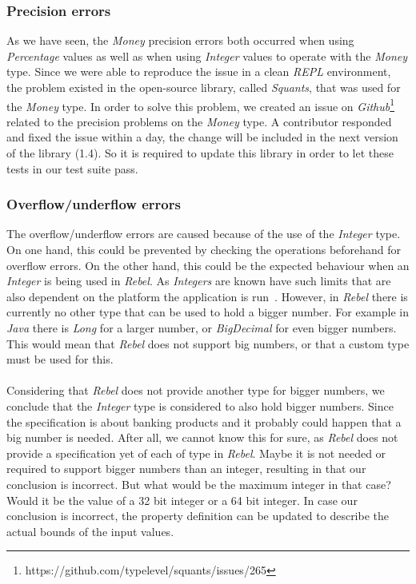 \subsubsection{Precision errors}
As we have seen, the \textit{Money} precision errors both occurred when using
\textit{Percentage} values as well as when using \textit{Integer} values to
operate with the \textit{Money} type. Since we were able to reproduce the issue
in a clean \textit{REPL} environment, the problem existed in the open-source
library, called \textit{Squants}, that was used for the \textit{Money} type. In
order to solve this problem, we created an issue on
\textit{Github}\footnote{https://github.com/typelevel/squants/issues/265}
related to the precision problems on the \textit{Money} type. A contributor
responded and fixed the issue within a day, the change will be included in the
next version of the library (1.4). So it is required to update this library in
order to let these tests in our test suite pass.

\subsubsection{Overflow/underflow errors}
The overflow/underflow errors are caused because of the use of the
\textit{Integer} type. On one hand, this could be prevented by checking the
operations beforehand for overflow errors. On the other hand, this could be the
expected behaviour when an \textit{Integer} is being used in \textit{Rebel}. As
\textit{Integers} are known have such limits that are also dependent on the
platform the application is run~\cite{wang2009intscope}. However, in
\textit{Rebel} there is currently no other type that can be used to hold a
bigger number. For example in \textit{Java} there is \textit{Long} for a larger
number, or \textit{BigDecimal} for even bigger numbers. This would mean that
\textit{Rebel} does not support big numbers, or that a custom type must be used
for this.\\
\\
Considering that \textit{Rebel} does not provide another type for
bigger numbers, we conclude that the \textit{Integer} type is considered to also
hold bigger numbers. Since the specification is about banking products and it
probably could happen that a big number is needed. After all, we cannot know
this for sure, as \textit{Rebel} does not provide a specification yet of each of
type in \textit{Rebel}. Maybe it is not needed or required to support bigger
numbers than an integer, resulting in that our conclusion is incorrect. But what
would be the maximum integer in that case? Would it be the value of a 32 bit
integer or a 64 bit integer. In case our conclusion is incorrect, the property
definition can be updated to describe the actual bounds of the input values.

